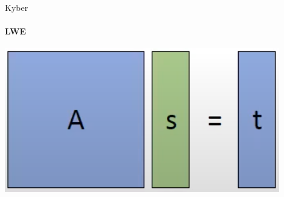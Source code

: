 \documentclass{rosenpass-beamer}
\begin{document}

\begin{frame}{Kyber}
\framesubtitle{LWE}
    \includegraphics[height=.6\textheight]{assets/matrix.png}
\end{frame}

\end{document}

